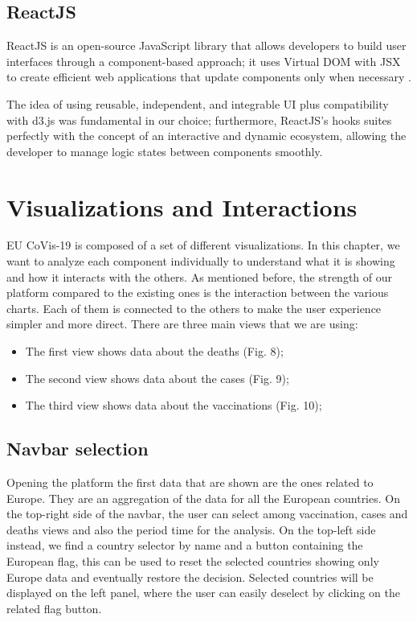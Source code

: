 \documentclass[10pt,conference]{IEEEtran}
\begin{document}
\subsection{ReactJS}
ReactJS is an open-source JavaScript library that allows developers to build user interfaces through a component-based approach; it uses Virtual DOM with JSX to create efficient web applications that update components only when necessary \cite{react}.

The idea of using reusable, independent, and integrable UI plus compatibility with d3.js was fundamental in our choice;
furthermore, ReactJS's hooks suites perfectly with the concept of an interactive and dynamic ecosystem, allowing the developer to manage logic states between components smoothly.


\section{Visualizations and Interactions}
EU CoVis-19 is composed of a set of different visualizations. In this chapter, we want to analyze each component individually to understand what it
is showing and how it interacts with the others. As mentioned before, the strength of our platform compared to the existing ones is 
the interaction between the various charts. Each of them is connected to the others to make the user experience 
simpler and more direct.
There are three main views that we are using:
\begin{itemize}
 \item The first view shows data about the deaths (Fig. 8);
 \item The second view shows data about the cases (Fig. 9);
 \item The third view shows data about the vaccinations (Fig. 10);
\end{itemize}

\subsection{Navbar selection}
Opening the platform the first data that are shown are the ones related to Europe. They are an aggregation of the data for all the European countries.
On the top-right side of the navbar, the user can select among vaccination, cases and deaths views and also the period time for the analysis. On the top-left side instead, we find a country selector by name and a button containing the European flag, this can be used to reset the selected countries showing only Europe data and eventually restore the decision. Selected countries will be displayed on the left panel, where the user can easily deselect by clicking on the related flag button.
\end{document}
